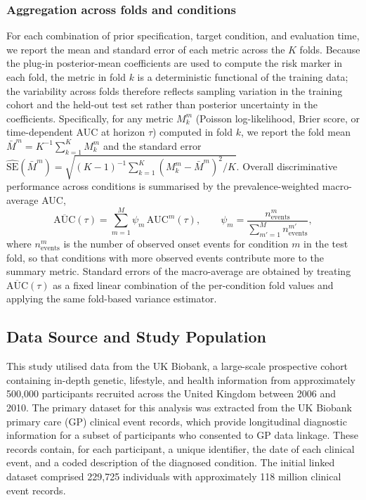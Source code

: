 \documentclass[12pt]{article}
\begin{document}
\subsubsection{Aggregation across folds and conditions} For each combination of prior specification, target condition, and evaluation time, we report the mean and standard error of each metric across the $K$ folds. Because the plug-in posterior-mean coefficients are used to compute the risk marker in each fold, the metric in fold $k$ is a deterministic functional of the training data; the variability across folds therefore reflects sampling variation in the training cohort and the held-out test set rather than posterior uncertainty in the coefficients. Specifically, for any metric $M^m_k$ (Poisson log-likelihood, Brier score, or time-dependent AUC at horizon $\tau$) computed in fold $k$, we report the fold mean $\bar{M}^m = K^{-1}\sum_{k=1}^K M^m_k$ and the standard error $\widehat{\mathrm{SE}}(\bar{M}^m) = \sqrt{(K-1)^{-1} \sum_{k=1}^K (M^m_k - \bar{M}^m)^2 / K}$. Overall discriminative performance across conditions is summarised by the prevalence-weighted macro-average AUC,
\[
\overline{\mathrm{AUC}}(\tau) = \sum_{m=1}^{M} \psi_m\, \mathrm{AUC}^m(\tau), \qquad \psi_m = \frac{n^m_{\mathrm{events}}}{\sum_{m'=1}^M n^{m'}_{\mathrm{events}}},
\]
where $n^m_{\mathrm{events}}$ is the number of observed onset events for condition $m$ in the test fold, so that conditions with more observed events contribute more to the summary metric. Standard errors of the macro-average are obtained by treating $\overline{\mathrm{AUC}}(\tau)$ as a fixed linear combination of the per-condition fold values and applying the same fold-based variance estimator.


\subsection{Data Source and Study Population}\label{sec:data}

This study utilised data from the UK Biobank, a large-scale prospective cohort containing in-depth genetic, lifestyle, and health information from approximately 500,000 participants recruited across the United Kingdom between 2006 and 2010. The primary dataset for this analysis was extracted from the UK Biobank primary care (GP) clinical event records, which provide longitudinal diagnostic information for a subset of participants who consented to GP data linkage. These records contain, for each participant, a unique identifier, the date of each clinical event, and a coded description of the diagnosed condition. The initial linked dataset comprised 229,725 individuals with approximately 118 million clinical event records.
\end{document}
